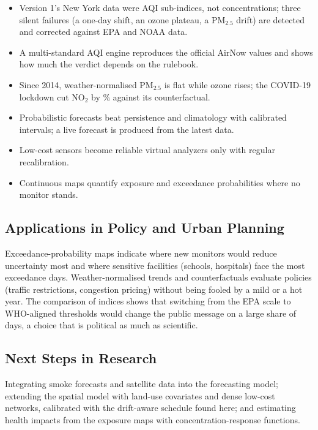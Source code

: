 \documentclass[11pt]{article}
\begin{document}
\begin{itemize}
\item Version 1's New York data were AQI sub-indices, not concentrations; three silent failures (a one-day shift, an ozone plateau, a PM$_{2.5}$ drift) are detected and corrected against EPA and NOAA data.
\item A multi-standard AQI engine reproduces the official AirNow values and shows how much the verdict depends on the rulebook.
\item Since 2014, weather-normalised PM$_{2.5}$ is flat while ozone rises; the COVID-19 lockdown cut NO$_2$ by \CovidNOtwo\% against its counterfactual.
\item Probabilistic forecasts beat persistence and climatology with calibrated intervals; a live forecast is produced from the latest data.
\item Low-cost sensors become reliable virtual analyzers only with regular recalibration.
\item Continuous maps quantify exposure and exceedance probabilities where no monitor stands.
\end{itemize}

\subsection{Applications in Policy and Urban Planning}

Exceedance-probability maps indicate where new monitors would reduce uncertainty most and where sensitive facilities (schools, hospitals) face the most exceedance days. Weather-normalised trends and counterfactuals evaluate policies (traffic restrictions, congestion pricing) without being fooled by a mild or a hot year. The comparison of indices shows that switching from the EPA scale to WHO-aligned thresholds would change the public message on a large share of days, a choice that is political as much as scientific.

\subsection{Next Steps in Research}

Integrating smoke forecasts and satellite data into the forecasting model; extending the spatial model with land-use covariates and dense low-cost networks, calibrated with the drift-aware schedule found here; and estimating health impacts from the exposure maps with concentration-response functions.



\end{document}
